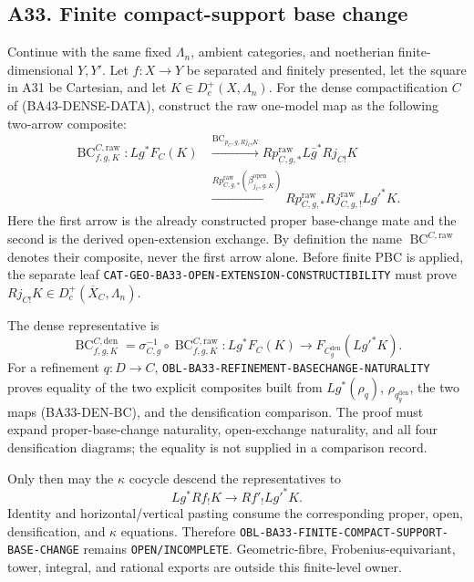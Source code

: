 \subsection*{A33. Finite compact-support base change}

Continue with the same fixed $\Lambda_n$, ambient categories, and
noetherian finite-dimensional $Y,Y'$.  Let $f:X\to Y$ be separated and
finitely presented, let the square in A31 be Cartesian, and let
$K\in D_c^+(X,\Lambda_n)$.  For the dense compactification $C$ of
\textup{(BA43-DENSE-DATA)}, construct the raw one-model map as the following
two-arrow composite:
\[
\begin{split}
 \operatorname{BC}^{C,\mathrm{raw}}_{f,g,K}:Lg^*F_C(K)
 &\xrightarrow{\operatorname{BC}_{p_C,g,Rj_{C!}K}}
 Rp^{\mathrm{raw}}_{C,g,*}L\bar g^*Rj_{C!}K\\
 &\xrightarrow{Rp^{\mathrm{raw}}_{C,g,*}
      (\beta^{\mathrm{open}}_{j_C,\bar g,K})}
 Rp^{\mathrm{raw}}_{C,g,*}Rj^{\mathrm{raw}}_{C,g,!}Lg'^*K.
\end{split}
\tag{BA33-RAW-BC}
\]
Here the first arrow is the already constructed proper base-change mate and
the second is the derived open-extension exchange.  By definition the name
$\operatorname{BC}^{C,\mathrm{raw}}$ denotes their composite, never the first
arrow alone.  Before finite PBC is applied, the separate leaf
\texttt{CAT-GEO-BA33-OPEN-EXTENSION-CONSTRUCTIBILITY} must prove
$Rj_{C!}K\in D_c^+(\overline X_C,\Lambda_n)$.

The dense representative is
\[
 \operatorname{BC}^{C,\mathrm{den}}_{f,g,K}
 =\sigma_{C,g}^{-1}\circ
   \operatorname{BC}^{C,\mathrm{raw}}_{f,g,K}:
 Lg^*F_C(K)\longrightarrow
 F_{C_g^{\mathrm{den}}}(Lg'^*K).
\tag{BA33-DEN-BC}
\]
For a refinement $q:D\to C$,
\texttt{OBL-BA33-REFINEMENT-BASECHANGE-NATURALITY} proves equality of the
two explicit composites built from $Lg^*(\rho_q)$,
$\rho_{q_g^{\mathrm{den}}}$, the two maps
\textup{(BA33-DEN-BC)}, and the densification comparison.  The proof must
expand proper-base-change naturality, open-exchange naturality, and all four
densification diagrams; the equality is not supplied in a comparison record.

Only then may the $\kappa$ cocycle descend the representatives to
\[
 Lg^*Rf_!K\longrightarrow Rf'_!Lg'^*K.
\]
Identity and horizontal/vertical pasting consume the corresponding proper,
open, densification, and $\kappa$ equations.  Therefore
\texttt{OBL-BA33-FINITE-COMPACT-SUPPORT-BASE-CHANGE} remains
\texttt{OPEN/INCOMPLETE}.  Geometric-fibre, Frobenius-equivariant, tower,
integral, and rational exports are outside this finite-level owner.

